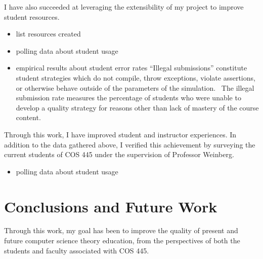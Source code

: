 \documentclass[pageno]{jpaper}
\begin{document}
I have also succeeded at leveraging the extensibility of my project to improve student resources.

\begin{itemize}
\item list resources created
\item polling data about student usage
\item empirical results about student error rates
  ``Illegal submissions'' constitute student strategies which do not compile, throw exceptions, violate assertions, or otherwise behave outside of the parameters of the simulation.~\cite{Poorly performing strategies which obey the specification are legal.}
  The illegal submission rate measures the percentage of students who were unable to develop a quality strategy for reasons other than lack of mastery of the course content.
\end{itemize}

Through this work, I have improved student and instructor experiences.
In addition to the data gathered above, I verified this achievement by surveying the current students of COS 445 under the supervision of Professor Weinberg.
\begin{itemize}
\item polling data about student usage
\end{itemize}




\section*{Conclusions and Future Work}
Through this work, my goal has been to improve the quality of present and future computer science theory education, from the perspectives of both the students and faculty associated with COS 445.
\end{document}
